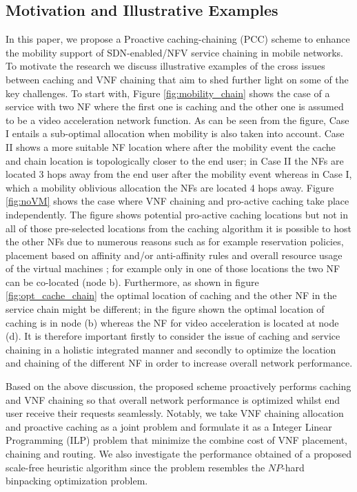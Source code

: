 \documentclass[journal]{IEEEtran}
\begin{document}
\subsection{Motivation and Illustrative Examples}
In this paper, we propose a Proactive caching-chaining (PCC) scheme to enhance the mobility support of SDN-enabled/NFV service chaining in mobile networks. To motivate the research we discuss illustrative examples of the cross issues between caching and VNF chaining that aim to shed further light on some of the key challenges. To start with, Figure \ref{fig:mobility_chain} shows the case of a service with two NF where the first one is caching and the other one is assumed to be a video acceleration network function. As can be seen from the figure, Case I entails a  sub-optimal allocation when mobility is also taken into account. Case II shows a more suitable NF location where after the mobility event the cache and chain location is topologically closer to the end user; in Case II the NFs are located 3 hops away from the end user after the mobility event whereas in Case I, which a mobility oblivious allocation the NFs are located 4 hops away. Figure \ref{fig:noVM} shows the case where VNF chaining and pro-active caching take place independently. The figure shows potential pro-active caching locations but not in all of those pre-selected locations from the caching algorithm it is possible to host the other NFs due to numerous reasons such
as for example reservation policies, placement based on affinity and/or anti-affinity rules and overall resource usage of the virtual machines \cite{affinity_NF}; for example only in one of those locations the two NF can be co-located (node b). Furthermore, as shown in figure \ref{fig:opt_cache_chain} the optimal location of caching and the other NF in the service chain might be different; in the figure shown the optimal location of caching is in node (b) whereas the NF for video acceleration is located at node (d). It is therefore important firstly to consider the issue of caching and service chaining in a holistic integrated manner and secondly to optimize the location and chaining of the different NF in order to increase overall network performance.

Based on the above discussion, the proposed scheme proactively performs caching and VNF chaining so that overall network performance is optimized whilst end user receive their requests seamlessly. Notably, we take VNF chaining allocation and proactive caching as a joint problem and formulate it as a Integer Linear Programming (ILP) problem that minimize the combine cost of VNF placement, chaining and routing. We also investigate the performance obtained of a proposed scale-free heuristic algorithm since the problem resembles the $NP$-hard binpacking optimization problem.
\end{document}
